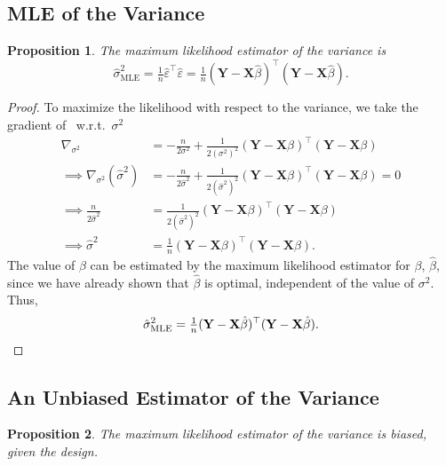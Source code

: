 \documentclass[letterpaper, reqno]{amsart}
\newtheorem{prop}{Proposition}[section]
\numberwithin{equation}{section}
\newcommand{\T}{\top} %
\newcommand{\vect}[1]{\boldsymbol{\mathbf{#1}}} %
\newcommand{\Xm}{\vect{X}}
\newcommand{\Yv}{\vect{Y}}
\newcommand{\Bv}{\beta}
\newcommand{\Bvh}{\hat{\beta}}
\newcommand{\ve}{\varepsilon}
\begin{document}
\subsection{MLE of the Variance}
\begin{prop}
  The maximum likelihood estimator of the variance is
  \[ \hat{\sigma}^2_\mathrm{MLE} = \tfrac{1}{n} \hat{\ve}^\T \hat{\ve} 
    = \tfrac{1}{n} (\Yv - \Xm\Bvh)^\T (\Yv - \Xm\Bvh). \]
\end{prop}

\begin{proof}
  To maximize the likelihood with respect to the variance, we take the gradient
  of~ w.r.t.\ $\sigma^2$
  \begin{align*}
    \nabla_{\sigma^2} &= -\frac{n}{2\sigma^2} + \frac{1}{2(\sigma^2)^2}(\Yv - \Xm\Bv)^\T(\Yv - \Xm\Bv) \\
    \implies \nabla_{\sigma^2}(\hat{\sigma}^2) &= -\frac{n}{2\hat{\sigma}^2} 
      + \frac{1}{2(\hat{\sigma}^2)^2}(\Yv - \Xm\Bv)^\T(\Yv - \Xm\Bv) = 0 \\
    \implies \frac{n}{2\hat{\sigma}^2} &= \frac{1}{2(\hat{\sigma}^2)^2}(\Yv - \Xm\Bv)^\T(\Yv - \Xm\Bv) \\
    \implies \hat{\sigma}^2 &= \tfrac{1}{n}(\Yv - \Xm\Bv)^\T(\Yv - \Xm\Bv).
  \end{align*}
  The value of $\Bv$ can be estimated by the maximum likelihood estimator for
  $\Bv$, $\Bvh$, since we have already shown that $\Bvh$ is optimal, independent
  of the value of $\sigma^2$. Thus,
  \[ \hat{\sigma}^2_\mathrm{MLE} = \tfrac{1}{n}(\Yv - \Xm\Bvh)^\T(\Yv - \Xm\Bvh). \qedhere \]
\end{proof}

\subsection{An Unbiased Estimator of the Variance}
\begin{prop}
  The maximum likelihood estimator of the variance is biased, given the design.
\end{prop}
\end{document}
